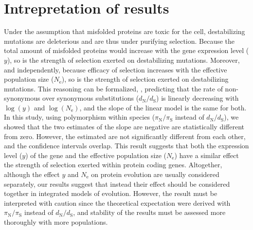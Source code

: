 \documentclass[10pt]{article}
\newcommand{\Ne}{N_{\text{e}}}
\newcommand{\dn}{d_{\text{N}}}
\newcommand{\ds}{d_{\text{S}}}
\newcommand{\dnds}{\dn / \ds}
\newcommand{\pin}{\pi_{\text{N}}}
\newcommand{\pis}{\pi_{\text{S}}}
\newcommand{\pinpis}{\pin / \pis}
\begin{document}
    \section{Intrepretation of results}
    Under the assumption that misfolded proteins are toxic for the cell, destabilizing mutations are deleterious and are thus under purifying selection.
    Because the total amount of misfolded proteins would increase with the gene expression level ($y$), so is the strength of selection exerted on destabilizing mutations.
    Moreover, and independently, because efficacy of selection increases with the effective population size ($\Ne$), so is the strength of selection exerted on destabilizing mutations.
    This reasoning can be formalized, \textcite[eq.~18]{latrille_quantifying_2021}, predicting that the rate of non-synonymous over synonymous substitutions ($\dnds$) is linearly decreasing with $\log(y)$ and $\log(\Ne)$, and the slope of the linear model is the same for both.
    In this study, using polymorphism within species ($\pinpis$ instead of $\dnds$), we showed that the two estimates of the slope are negative are statistically different from zero.
    However, the estimated are not significantly different from each other, and the confidence intervals overlap.
    This result suggests that both the expression level ($y$) of the gene and the effective population size ($\Ne$) have a similar effect the strength of selection exerted within protein coding genes.
    Altogether, although the effect $y$ and $\Ne$ on protein evolution are usually considered separately, our results suggest that instead their effect should be considered together in integrated models of evolution.
    However, the result must be interpreted with caution since the theoretical expectation were derived with $\pinpis$ instead of $\dnds$, and stability of the results must be assessed more thoroughly with more populations.

    \printbibliography
\end{document}
